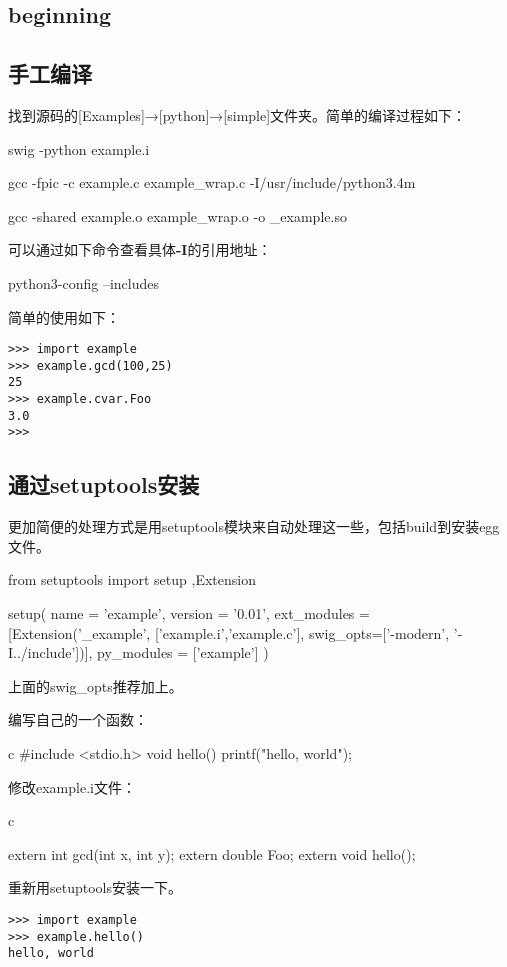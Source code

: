 \documentclass[12pt,oneside]{book}
\begin{document}
\begin{common-format}
\section{beginning}
\subsection{手工编译}
找到源码的[Examples]→[python]→[simple]文件夹。简单的编译过程如下：
\begin{tcbbash}[]
swig -python example.i

gcc -fpic -c example.c example_wrap.c -I/usr/include/python3.4m

gcc -shared example.o example_wrap.o -o _example.so
\end{tcbbash}

可以通过如下命令查看具体\textbf{-I}的引用地址：
\begin{tcbbash}[]
python3-config --includes
\end{tcbbash}

简单的使用如下：
\begin{Verbatim}
>>> import example
>>> example.gcd(100,25)
25
>>> example.cvar.Foo
3.0
>>> 
\end{Verbatim}

\subsection{通过setuptools安装}
更加简便的处理方式是用setuptools模块来自动处理这一些，包括build到安装egg文件。
\begin{tcbpython}[]
from setuptools import setup ,Extension

setup(
    name = 'example',
    version = '0.01',
    ext_modules = [Extension('_example', ['example.i','example.c'],
    swig_opts=['-modern', '-I../include'])],
    py_modules = ['example']
)
\end{tcbpython}
上面的swig\_{}opts推荐加上。

编写自己的一个函数：
\begin{tcbcode}{c}
#include <stdio.h>
void hello(){
    printf("hello, world\n");
}
\end{tcbcode}

修改example.i文件：
\begin{tcbcode}{c}

extern int    gcd(int x, int y);
extern double Foo;
extern void hello();
\end{tcbcode}

重新用setuptools安装一下。
\begin{Verbatim}
>>> import example
>>> example.hello()
hello, world
\end{Verbatim}






\end{common-format}
\end{document}
